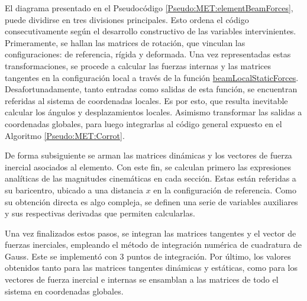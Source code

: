 El diagrama presentado en el Pseudocódigo \ref{Pseudo:MET:elementBeamForces}, puede dividirse en tres divisiones principales. Esto ordena el código consecutivamente según el desarrollo constructivo de las variables intervinientes. Primeramente, se hallan las matrices de rotación, que vinculan las configuraciones: de referencia, rígida y deformada. Una vez representadas estas transformaciones, se procede a calcular las fuerzas internas y las matrices tangentes en la configuración local a través de la función \href{https://github.com/ONSAS/ONSAS/blob/master/src/beamLocalStaticForces.m}{beamLocalStaticForces}. Desafortunadamente, tanto entradas como salidas de esta función, se encuentran referidas al sistema de coordenadas locales. Es por esto, que resulta inevitable calcular los ángulos y desplazamientos locales. Asimismo transformar las salidas a coordenadas globales, para luego integrarlas al código general expuesto en el Algoritmo  \ref{Pseudo:MET:Corrot}.

De forma subsiguiente se arman las matrices dinámicas y los vectores de fuerza inercial asociados al elemento. Con este fin, se calculan primero las expresiones analíticas de las magnitudes cinemáticas en cada sección. Estas están referidas a su baricentro, ubicado a una distancia $x$ en la configuración de referencia. Como su obtención directa es algo compleja, se definen una serie de variables auxiliares y sus respectivas derivadas que permiten calcularlas.  

Una vez finalizados estos pasos, se integran las matrices tangentes y el vector de fuerzas inerciales, empleando el método de integración numérica de cuadratura de Gauss. Este se implementó con 3 puntos de integración. Por último, los valores obtenidos tanto para las matrices tangentes dinámicas y estáticas, como para los vectores de fuerza inercial e internas se ensamblan a las matrices de todo el sistema en coordenadas globales.

